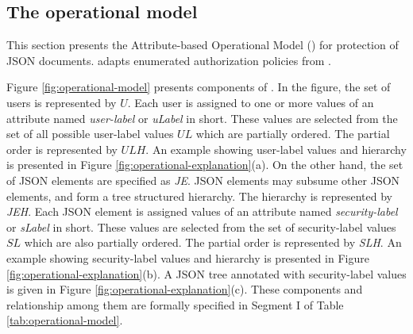

\subsection{The operational model}





\label{sec:operational-model}


This section presents the Attribute-based Operational Model (\atom{}) for protection of JSON documents. \atom{} adapts enumerated authorization policies from  \cite{labac,eap-abac}.





Figure \ref{fig:operational-model} presents components of \atom{}. In the figure, the set of users is represented by $U$. Each user is assigned to one or more values of an attribute named \textit{user-label} or \textit{uLabel} in short. These values are selected from the set of all possible user-label values $UL$ which are partially ordered. The partial order is represented by $ULH$. An example showing user-label values and  hierarchy is presented in Figure \ref{fig:operational-explanation}(a). On the other hand, the set of JSON elements are specified as \textit{JE}. JSON elements may subsume other JSON elements, and form a tree structured hierarchy. The hierarchy is represented by \textit{JEH}. Each JSON element is assigned values of an attribute named \textit{security-label} or \textit{sLabel} in short. These values are selected from the set of security-label values $SL$ which are also partially ordered. The partial order is represented by \textit{SLH}. An example showing security-label values and  hierarchy is presented in Figure \ref{fig:operational-explanation}(b). A JSON tree annotated with security-label values is given in Figure \ref{fig:operational-explanation}(c). These components and relationship among them are formally specified in Segment I of Table  \ref{tab:operational-model}.


